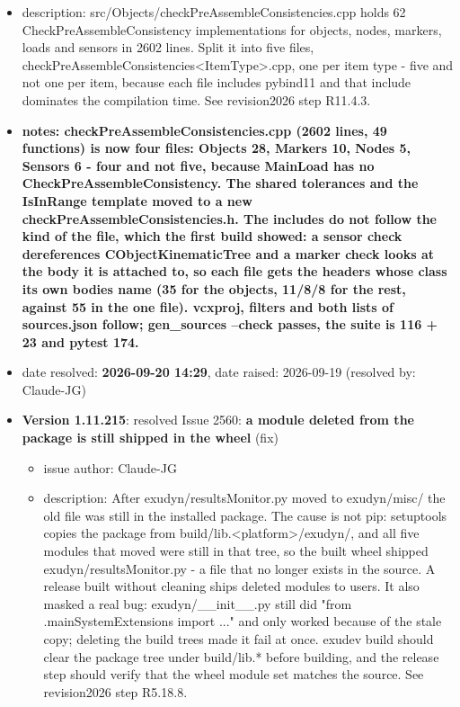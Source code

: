 \begin{itemize}
\begin{itemize}
\begin{itemize}
\begin{itemize}
\begin{itemize}
\begin{itemize}
    \item {description: src/Objects/checkPreAssembleConsistencies.cpp holds 62 CheckPreAssembleConsistency implementations for objects, nodes, markers, loads and sensors in 2602 lines. Split it into five files, checkPreAssembleConsistencies<ItemType>.cpp, one per item type - five and not one per item, because each file includes pybind11 and that include dominates the compilation time. See revision2026 step R11.4.3.}
    \item {\bf notes: checkPreAssembleConsistencies.cpp (2602 lines, 49 functions) is now four files: Objects 28, Markers 10, Nodes 5, Sensors 6 - four and not five, because MainLoad has no CheckPreAssembleConsistency. The shared tolerances and the IsInRange template moved to a new checkPreAssembleConsistencies.h. The includes do not follow the kind of the file, which the first build showed: a sensor check dereferences CObjectKinematicTree and a marker check looks at the body it is attached to, so each file gets the headers whose class its own bodies name (35 for the objects, 11/8/8 for the rest, against 55 in the one file). vcxproj, filters and both lists of sources.json follow; gen\_sources --check passes, the suite is 116 + 23 and pytest 174.}
    \item   date resolved: {\bf 2026-09-20 14:29},
date raised: 2026-09-19 (resolved by: Claude-JG)
  \ei
  \item[] {\bf Version 1.11.215}:  resolved Issue 2560: {\bf a module deleted from the package is still shipped in the wheel}
(fix)
\vspace{-6pt}   \begin{itemize} \setlength\itemsep{-1pt}
    \item issue author: Claude-JG
    \item {description: After exudyn/resultsMonitor.py moved to exudyn/misc/ the old file was still in the installed package. The cause is not pip: setuptools copies the package from build/lib.<platform>/exudyn/, and all five modules that moved were still in that tree, so the built wheel shipped exudyn/resultsMonitor.py - a file that no longer exists in the source. A release built without cleaning ships deleted modules to users. It also masked a real bug: exudyn/\_\_init\_\_.py still did "from .mainSystemExtensions import ..." and only worked because of the stale copy; deleting the build trees made it fail at once. exudev build should clear the package tree under build/lib.* before building, and the release step should verify that the wheel module set matches the source. See revision2026 step R5.18.8.}

\end{itemize}
\end{itemize}
\end{itemize}
\end{itemize}
\end{itemize}
\end{itemize}
\end{itemize}
